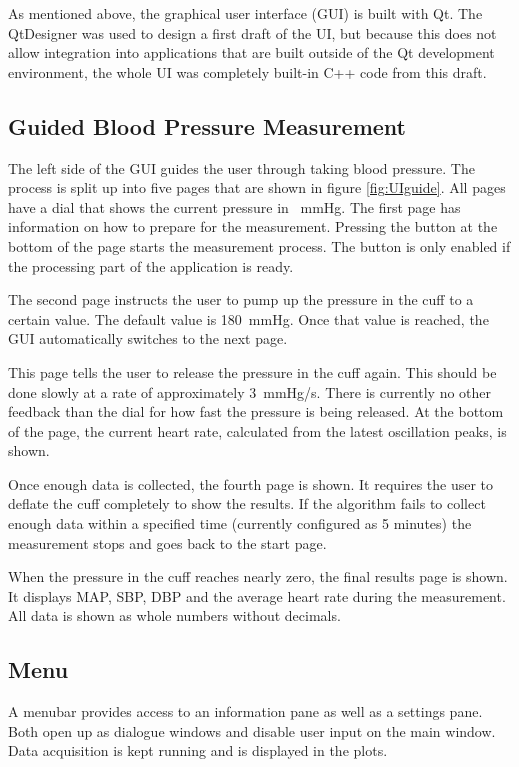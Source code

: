 As mentioned above, the graphical user interface (GUI) is built with Qt.
The QtDesigner was used to design a first draft of the UI, but because this does not allow integration into applications that are built outside of the Qt development environment, the whole UI was completely built-in C++ code from this draft.

\subsection{Guided Blood Pressure Measurement}
The left side of the GUI guides the user through taking blood pressure. The process is split up into five pages that are shown in figure \ref{fig:UIguide}.  All pages have a dial that shows the current pressure in \SI{}{\mmHg}. The first page has information on how to prepare for the measurement. Pressing the button at the bottom of the page starts the measurement process. The button is only enabled if the processing part of the application is ready.

The second page instructs the user to pump up the pressure in the cuff to a certain value. The default value is \SI{180}{\mmHg}. Once that value is reached, the GUI automatically switches to the next page.

This page tells the user to release the pressure in the cuff again. This should be done slowly at a rate of approximately \SI{3}{\mmHg/\second}. There is currently no other feedback than the dial for how fast the pressure is being released. At the bottom of the page, the current heart rate, calculated from the latest oscillation peaks, is shown.

Once enough data is collected, the fourth page is shown. It requires the user to deflate the cuff completely to show the results. If the algorithm fails to collect enough data within a specified time (currently configured as 5 minutes) the measurement stops and goes back to the start page.

When the pressure in the cuff reaches nearly zero, the final results page is shown. It displays MAP, SBP, DBP and the average heart rate during the measurement. All data is shown as whole numbers without decimals. 

\subsection{Menu}
A menubar provides access to an information pane as well as a settings pane. Both open up as dialogue windows and disable user input on the main window. Data acquisition is kept running and is displayed in the plots.

